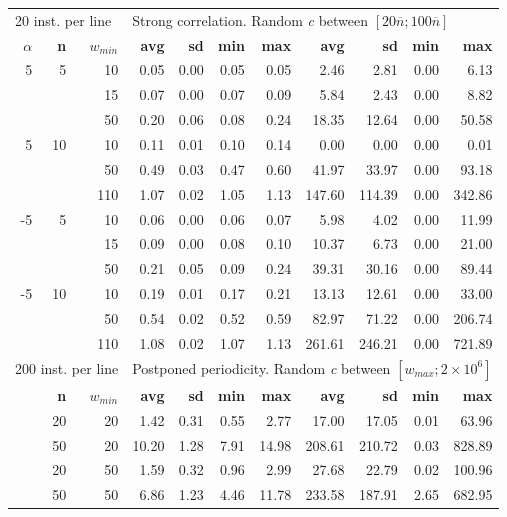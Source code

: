 \documentclass[runningheads,a4paper]{llncs}
\begin{document}
\begin{centering}
\begin{table}
\begin{tabular}{@{\extracolsep{4pt}}rrrrrrrrrrr@{}}
\multicolumn{3}{l}{20 inst. per line} & \multicolumn{8}{l}{Strong correlation. Random \emph{c} between \([20\overline{n}; 100\overline{n}]\)}\\
\cline{1-3}\cline{4-11}
\textbf{\(\alpha\)} & \textbf{n} & \(w_{min}\) & \textbf{avg} & \textbf{sd} & \textbf{min} & \textbf{max} & \textbf{avg} & \textbf{sd} & \textbf{min} & \textbf{max}\\
\cline{1-3}\cline{4-7}\cline{8-11}
 5 & 5  & 10 & 0.05 & 0.00 & 0.05 & 0.05 & 2.46 & 2.81 & 0.00 & 6.13\\
   &    & 15 & 0.07 & 0.00 & 0.07 & 0.09 & 5.84 & 2.43 & 0.00 & 8.82\\
   &    & 50 & 0.20 & 0.06 & 0.08 & 0.24 & 18.35 & 12.64 & 0.00 & 50.58\\
 5 & 10 & 10 & 0.11 & 0.01 & 0.10 & 0.14 & 0.00 & 0.00 & 0.00 & 0.01\\
   &    & 50 & 0.49 & 0.03 & 0.47 & 0.60 & 41.97 & 33.97 & 0.00 & 93.18\\
   &    & 110 & 1.07 & 0.02 & 1.05 & 1.13 & 147.60 & 114.39 & 0.00 & 342.86\\
-5 & 5  & 10 & 0.06 & 0.00 & 0.06 & 0.07 & 5.98 & 4.02 & 0.00 & 11.99\\
   &    & 15 & 0.09 & 0.00 & 0.08 & 0.10 & 10.37 & 6.73 & 0.00 & 21.00\\
   &    & 50 & 0.21 & 0.05 & 0.09 & 0.24 & 39.31 & 30.16 & 0.00 & 89.44\\
-5 & 10 & 10 & 0.19 & 0.01 & 0.17 & 0.21 & 13.13 & 12.61 & 0.00 & 33.00\\
   &    & 50 & 0.54 & 0.02 & 0.52 & 0.59 & 82.97 & 71.22 & 0.00 & 206.74\\
   &    & 110& 1.08 & 0.02 & 1.07 & 1.13 & 261.61 & 246.21 & 0.00 & 721.89\\
\hline

\multicolumn{3}{l}{200 inst. per line} & \multicolumn{8}{l}{Postponed periodicity. Random \emph{c} between \([w_{max}; 2\times10^6]\)}\\
\cline{1-3}\cline{4-11}
& \textbf{n} & \(w_{min}\) & \textbf{avg} & \textbf{sd} & \textbf{min} & \textbf{max} & \textbf{avg} & \textbf{sd} & \textbf{min} & \textbf{max}\\
\cline{1-3}\cline{4-7}\cline{8-11}
& 20 & 20 & 1.42 & 0.31 & 0.55 & 2.77 & 17.00 & 17.05 & 0.01 & 63.96\\
& 50 & 20 & 10.20 & 1.28 & 7.91 & 14.98 & 208.61 & 210.72 & 0.03 & 828.89\\
& 20 & 50 & 1.59 & 0.32 & 0.96 & 2.99 & 27.68 & 22.79 & 0.02 & 100.96\\
& 50 & 50 & 6.86 & 1.23 & 4.46 & 11.78 & 233.58 & 187.91 & 2.65 & 682.95\\
\hline


\end{tabular}
\end{table}
\end{centering}
\end{document}
